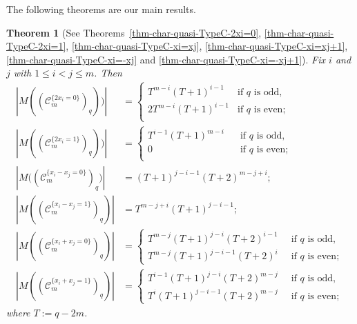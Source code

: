 \documentclass{article}
\theoremstyle{plain}
\newtheorem{Them}{Theorem}[section]
\theoremstyle{definition}
\theoremstyle{remark}
\numberwithin{equation}{section}
\begin{document}
The following theorems are our main results. 
\begin{Them}[See Theorems~\ref{thm-char-quasi-TypeC-2xi=0}, \ref{thm-char-quasi-TypeC-2xi=1}, \ref{thm-char-quasi-TypeC-xi=xj}, \ref{thm-char-quasi-TypeC-xi=xj+1}, \ref{thm-char-quasi-TypeC-xi=-xj} and \ref{thm-char-quasi-TypeC-xi=-xj+1}]\label{thm-main-typeC}
Fix $i$ and $j$ with $1\leq i<j \leq m$. Then 
\begin{align*}
\left|M({(\mathcal{C}_m^{\{2x_i=0\}})}_q))\right|&=
\begin{cases}
T^{m-i}(T+1)^{i-1}\;\;&\text{if $q$ is odd},\\
2T^{m-i}(T+1)^{i-1} &\text{if $q$ is even};\\
\end{cases} \\
\left|M({(\mathcal{C}_m^{\{2x_i=1\}})}_q))\right|&=
\begin{cases}
T^{i-1}(T+1)^{m-i}\;\;\;&\text{if $q$ is odd},\\
0 &\text{if $q$ is even};\\
\end{cases} \\
\left|M{((\mathcal{C}_m^{\{x_i - x_j=0\}})}_q)\right|&=(T+1)^{j-i-1}(T+2)^{m-j+i};\\
\left|M({(\mathcal{C}_m^{\{x_i - x_j=1\}})}_q)\right|&=T^{m-j+i}(T+1)^{j-i-1};\\
\left|M({(\mathcal{C}_m^{\{x_i + x_j=0\}})}_q)\right|&=
\begin{cases}
T^{m-j}(T+1)^{j-i}(T+2)^{i-1} \;\; &\text{if $q$ is odd},\\
T^{m-j}(T+1)^{j-i-1}(T+2)^i &\text{if $q$ is even};
\end{cases} \\
\left|M({(\mathcal{C}_m^{\{x_i + x_j=1\}})}_q)\right|&=
\begin{cases}
T^{i-1}(T+1)^{j-i}(T+2)^{m-j} \;\; &\text{if $q$ is odd},\\
T^i(T+1)^{j-i-1}(T+2)^{m-j} &\text{if $q$ is even}; 
\end{cases} 
\end{align*}
where $T:=q-2m$. 
\end{Them}
\end{document}
